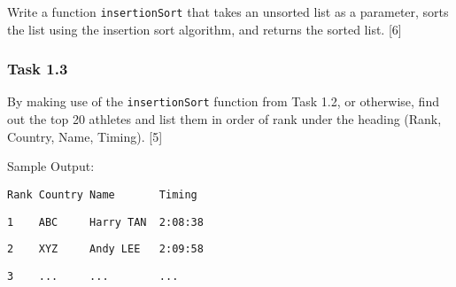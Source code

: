 Write a function \texttt{insertionSort} that takes an unsorted list
as a parameter, sorts the list using the insertion sort algorithm,
and returns the sorted list. \hfill{}{[}6{]}

\subsubsection*{Task 1.3 }

By making use of the \texttt{insertionSort} function from Task 1.2,
or otherwise, find out the top 20 athletes and list them in order
of rank under the heading (Rank, Country, Name, Timing). \hfill{}{[}5{]} 

Sample Output: 

\noindent\begin{minipage}[t]{1\columnwidth}%
\texttt{Rank Country Name ~~~~~~Timing }

\texttt{1 ~~~ABC ~~~~Harry TAN ~2:08:38 }

\texttt{2 ~~~XYZ ~~~~Andy LEE ~~2:09:58 }

\texttt{3 ~~~... ~~~~... ~~~~~~~... }%
\end{minipage}